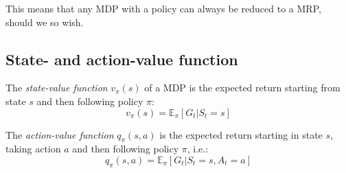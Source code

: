 \documentclass[12pt, a4paper]{article}
\numberwithin{equation}{section}
\begin{document}
This means that any MDP with a policy can always be reduced to a MRP, should we so wish.

\subsection{State- and action-value function}
The \textit{state-value function} $v_\pi(s)$ of a MDP is the expected return starting from state $s$ and then following policy $\pi$:
\begin{equation}
v_\pi(s)=\mathbb{E}_\pi[G_t|S_t=s]
\end{equation}

The \textit{action-value function} $q_\pi(s,a)$ is the expected return starting in state $s$, taking action $a$ and then following policy $\pi$, i.e.:
\begin{equation}
q_\pi(s, a)=\mathbb{E}_\pi[G_t|S_t=s, A_t=a]
\end{equation}
\end{document}
